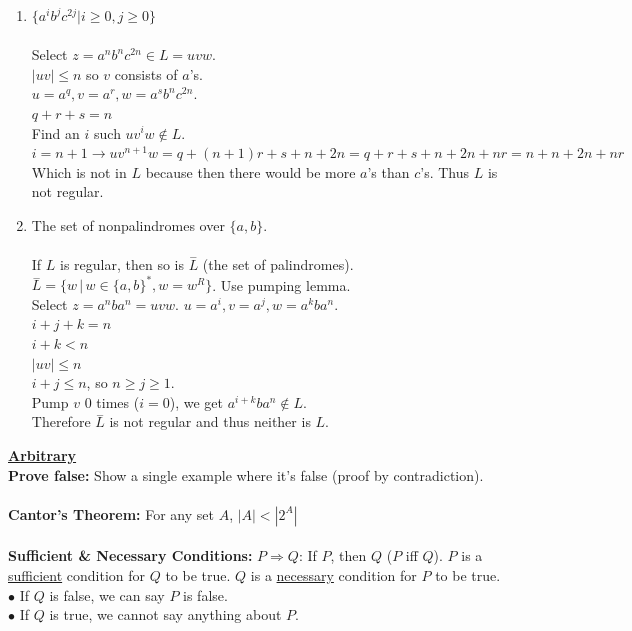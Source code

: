 \documentclass[8pt,letterpaper,twocolumn]{article}
\begin{document}
\begin{enumerate}
  \item $\{a^i b^j c^{2j} | i \geq 0, j \geq 0\}$\\
  \\
  Select $z = a^n b^n c^{2n} \in L = uvw$.\\
  $|uv| \leq n$ so $v$ consists of $a$'s.\\
  $u = a^q, v = a^r, w = a^s b^n c^{2n}$.\\
  $q + r + s = n$\\
  Find an $i$ such $uv^iw \notin L$.\\
  $i = n+1 \rightarrow uv^{n+1}w = q + (n+1)r + s + n + 2n = q + r +s + n + 2n + nr = n + n + 2n + nr$\\
  Which is not in $L$ because then there would be more $a$'s than $c$'s. Thus $L$ is not regular.  
  
  \item The set of nonpalindromes over $\{a,b\}$.\\
  \\
  If $L$ is regular, then so is $\stackrel{-}{L}$ (the set of palindromes).\\
  $\stackrel{-}{L} = \{w\,|\,w \in \{a,b\}^*, w = w^R\}$. Use pumping lemma.\\
  Select $z = a^n b a^n = uvw$. $u = a^i, v=a^j, w=a^k b a^n$.\\
  $i+j+k=n$\\
  $i+k < n$\\
  $|uv| \leq n$\\
  $i + j \leq n$, so $n \geq j \geq 1$.\\
  Pump $v$ 0 times ($i=0$), we get $a^{i+k}b a^n \notin L$.\\
  Therefore $\stackrel{-}{L}$ is not regular and thus neither is $L$.
  \end{enumerate}
\underline{\textbf{Arbitrary}}\\
\textbf{Prove false:} Show a single example where it's false (proof by contradiction).\\
\\
\textbf{Cantor's Theorem:} For any set $A$, $|A| < |2^A|$\\
\\
\textbf{Sufficient \& Necessary Conditions:} $P \Rightarrow Q$: If $P$, then $Q$ ($P$ iff $Q$).
$P$ is a \underline{sufficient} condition for $Q$ to be true.
$Q$ is a \underline{necessary} condition for $P$ to be true.\\
$\bullet$ If $Q$ is false, we can say $P$ is false.\\
$\bullet$ If $Q$ is true, we cannot say anything about $P$.\\
\end{document}
